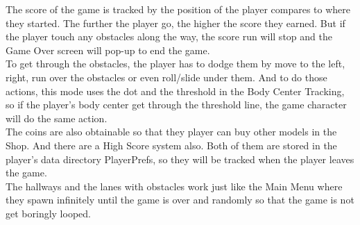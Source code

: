\documentclass[12pt]{article}
\begin{document}
The score of the game is tracked by the position of the player compares to where they started. The further the player go, the higher the score they earned.
But if the player touch any obstacles along the way, the score run will stop and the Game Over screen will pop-up to end the game.\\

To get through the obstacles, the player has to dodge them by move to the left, right, run over the obstacles or even roll/slide under them.
And to do those actions, this mode uses the dot and the threshold in the Body Center Tracking, so if the player's body center get through the threshold line, the game character will do the same action.\\

The coins are also obtainable so that they player can buy other models in the Shop. And there are a High Score system also.
Both of them are stored in the player's data directory PlayerPrefs, so they will be tracked when the player leaves the game.\\

The hallways and the lanes with obstacles work just like the Main Menu where they spawn infinitely until the game is over and randomly so that the game is not get boringly looped.
\end{document}
